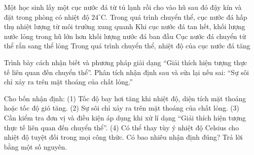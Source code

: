 \begin{ex}
	{\color{red}\footnotesize\ttfamily [L12C1B1-DS-4]}\par %
	Một học sinh lấy một cục nước đá từ tủ lạnh rồi cho vào hũ sau đó đậy kín và đặt trong phòng có nhiệt độ $24^\circ \mathrm{C}$.
	\choiceTF
	{\True Trong quá trình chuyển thể, cục nước đá hấp thụ nhiệt lượng từ môi trường xung quanh}
	{Khi cục nước đá tan hết, khối lượng nước lỏng trong hũ lớn hơn khối lượng nước đá ban đầu}
	{\True Cục nước đá chuyển từ thể rắn sang thể lỏng}
	{Trong quá trình chuyển thể, nhiệt độ của cục nước đá tăng}
\end{ex}

\begin{bt}
Trình bày cách nhận biết và phương pháp giải dạng “Giải thích hiện tượng thực tế liên quan đến chuyển thể”. Phân tích nhận định sau và sửa lại nếu sai: “Sự sôi chỉ xảy ra trên mặt thoáng của chất lỏng.”
\end{bt}

\begin{ex}
Cho bốn nhận định: (1) Tốc độ bay hơi tăng khi nhiệt độ, diện tích mặt thoáng hoặc tốc độ gió tăng. (2) Sự sôi chỉ xảy ra trên mặt thoáng của chất lỏng. (3) Cần kiểm tra đơn vị và điều kiện áp dụng khi xử lí dạng “Giải thích hiện tượng thực tế liên quan đến chuyển thể”. (4) Có thể thay tùy ý nhiệt độ Celsius cho nhiệt độ tuyệt đối trong mọi công thức. Có bao nhiêu nhận định đúng? Trả lời bằng một số nguyên.
\end{ex}

